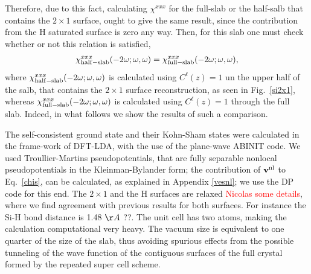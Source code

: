 \documentclass[floatfix,prb,aps,superscriptaddress,11pt,preprint,letterpaper]{revtex4}
\begin{document}
Therefore, due to this fact, calculating $\chi^{xxx}$ for the full-slab
or the half-salb that contains the $2\times 1$ surface,\cite{nota1}
 ought to give the same result, since the contribution from the H
 saturated  surface is zero any way. Then, for this slab one must check
 whether or not this relation is satisfied,
\begin{align}\label{hs}
\chi_{\mathrm{half-slab}}^{xxx}(-2\omega;\omega,\omega) 
=
\chi_{\mathrm{full-slab}}^{xxx}(-2\omega;\omega,\omega)
,
\end{align}
where
$\chi_{\mathrm{half-slab}}^{xxx}(-2\omega;\omega,\omega)$ is calculated using
$C^\ell(z)=1$ un the upper half of the salb, that contains the
$2\times 1$ surface reconstruction, as seen in
Fig.~\ref{si2x1},
whereas $\chi_{\mathrm{full-slab}}^{xxx}(-2\omega;\omega,\omega)$ is calculated using
$C^\ell(z)=1$ through the full slab.
Indeed, in what follows we show the results of such a comparison.

The self-consistent ground state and their Kohn-Sham states were
calculated in the frame-work of DFT-LDA,
with the use of the plane-wave ABINIT
code.\cite{abinit}
We used
Troullier-Martins
pseudopotentials,\cite{troullierPRB91} 
that are 
fully separable nonlocal pseudopotentials in the 
Kleinman-Bylander 
form;\cite{kleinmanPRL82}
the contribution of $\mathbf{v}^{\mathrm{nl}}$ to Eq.~\eqref{chis},
can be calculated, as explained in Appendix \ref{vesnl}; 
we use the DP code for this end.\cite{francesco}
The $2\times 1$ and the H surfaces are relaxed \textcolor{red}{Nicolas 
  some details}, where we find agreement with previous results for 
both surfaces.\cite{relax} For instance the Si-H bond distance is 1.48 
$\AA$ ??. The unit cell has two atoms, making the calculation
computational very heavy. The vacuum size is equivalent to one quarter
of the
size of the slab, thus avoiding spurious effects from the possible
tunneling of the wave function of the contiguous surfaces of the full
crystal formed by the repeated super cell scheme.\cite{mendozaPRB06}    
\end{document}
